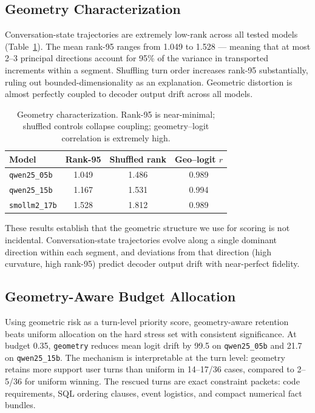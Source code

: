 \documentclass[conference]{IEEEtran}
\begin{document}
\subsection{Geometry Characterization}
\label{sec:char}

Conversation-state trajectories are extremely low-rank across all tested
models (Table~\ref{tab:char}). The mean rank-95 ranges from 1.049 to 1.528
--- meaning that at most 2--3 principal directions account for 95\% of the
variance in transported increments within a segment. Shuffling turn order
increases rank-95 substantially, ruling out bounded-dimensionality as an
explanation. Geometric distortion is almost perfectly coupled to decoder
output drift across all models.

\begin{table}[t]
  \centering
  \caption{Geometry characterization. Rank-95 is near-minimal; shuffled controls
  collapse coupling; geometry--logit correlation is extremely high.}
  \label{tab:char}
  \begin{tabular}{lccc}
    \toprule
    Model & Rank-95 & Shuffled rank & Geo--logit $r$ \\
    \midrule
    \texttt{qwen25\_05b} & 1.049 & 1.486 & 0.989 \\
    \texttt{qwen25\_15b} & 1.167 & 1.531 & 0.994 \\
    \texttt{smollm2\_17b} & 1.528 & 1.812 & 0.989 \\
    \bottomrule
  \end{tabular}
\end{table}

These results establish that the geometric structure we use for scoring is not
incidental. Conversation-state trajectories evolve along a single dominant
direction within each segment, and deviations from that direction (high
curvature, high rank-95) predict decoder output drift with near-perfect
fidelity.

\subsection{Geometry-Aware Budget Allocation}
\label{sec:paper2}

Using geometric risk as a turn-level priority score, geometry-aware retention
beats uniform allocation on the hard stress set with consistent significance.
At budget 0.35, \texttt{geometry} reduces mean logit drift by 99.5 on
\texttt{qwen25\_05b} and 21.7 on \texttt{qwen25\_15b}. The mechanism is
interpretable at the turn level: geometry retains more support user turns
than uniform in 14--17/36 cases, compared to 2--5/36 for uniform winning. The
rescued turns are exact constraint packets: code requirements, SQL ordering
clauses, event logistics, and compact numerical fact bundles.
\end{document}
